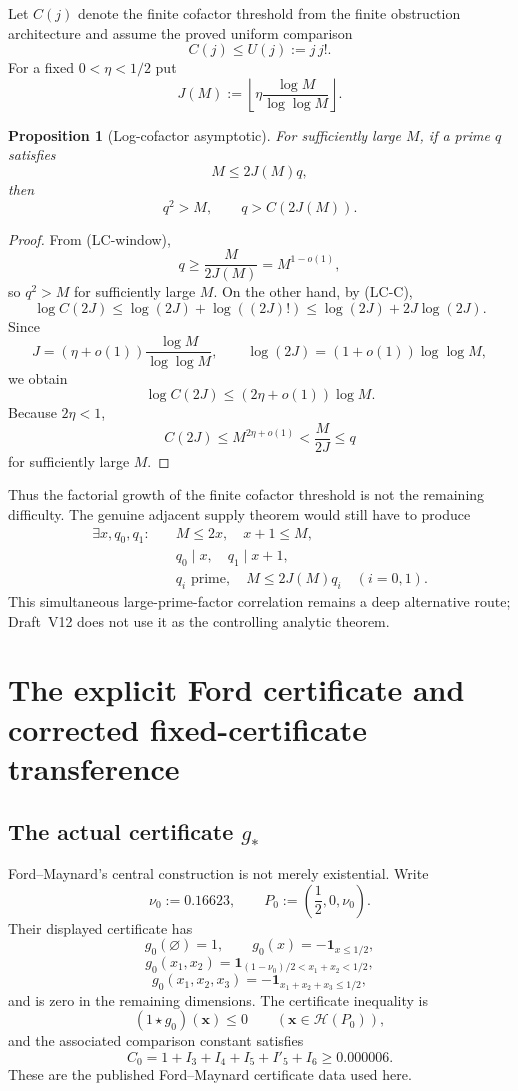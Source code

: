 \documentclass[11pt]{article}
\newtheorem{proposition}[theorem]{Proposition}
\theoremstyle{definition}
\theoremstyle{remark}
\newcommand{\1}{\mathbf 1}
\begin{document}
Let $C(j)$ denote the finite cofactor threshold from the finite obstruction architecture and assume the proved
uniform comparison
\[
 C(j)\le U(j):=j\,j!.
 \tag{LC-C}
\]
For a fixed $0<\eta<1/2$ put
\[
 J(M):=\left\lfloor \eta\frac{\log M}{\log\log M}\right\rfloor.
 \tag{LC-J}
\]

\begin{proposition}[Log-cofactor asymptotic]\label{prop:logcof}
For sufficiently large $M$, if a prime $q$ satisfies
\[
 M\le 2J(M)q,
 \tag{LC-window}
\]
then
\[
 q^2>M,\qquad q>C(2J(M)).
\]
\end{proposition}
\begin{proof}
From (LC-window),
\[
 q\ge \frac{M}{2J(M)}=M^{1-o(1)},
\]
so $q^2>M$ for sufficiently large $M$.  On the other hand, by (LC-C),
\[
 \log C(2J)\le \log(2J)+\log((2J)!)
 \le \log(2J)+2J\log(2J).
\]
Since
\[
 J=(\eta+o(1))\frac{\log M}{\log\log M},\qquad
 \log(2J)=(1+o(1))\log\log M,
\]
we obtain
\[
 \log C(2J)\le (2\eta+o(1))\log M.
\]
Because $2\eta<1$,
\[
 C(2J)\le M^{2\eta+o(1)}<\frac{M}{2J}\le q
\]
for sufficiently large $M$.
\end{proof}

Thus the factorial growth of the finite cofactor threshold is not the remaining difficulty.  The genuine
adjacent supply theorem would still have to produce
\[
 \boxed{\begin{aligned}
 \exists x,q_0,q_1:\quad &M\le2x,\quad x+1\le M,\\
 &q_0\mid x,\quad q_1\mid x+1,\\
 &q_i\text{ prime},\quad M\le2J(M)q_i\quad(i=0,1).
 \end{aligned}}
 \tag{LC-supply}
\]
This simultaneous large-prime-factor correlation remains a deep alternative route; Draft~V12 does not use it as
the controlling analytic theorem.

\section{The explicit Ford certificate and corrected fixed-certificate transference}
\label{sec:fixed-cert}

\subsection{The actual certificate $g_*$}

Ford--Maynard's central construction is not merely existential.  Write
\[
 \nu_0:=0.16623,\qquad P_0:=\left(\frac12,0,\nu_0\right).
\]
Their displayed certificate has
\[
 g_0(\varnothing)=1,\qquad
 g_0(x)=-\mathbf 1_{x\le1/2},
\]
\[
 g_0(x_1,x_2)
 =\mathbf 1_{(1-\nu_0)/2<x_1+x_2<1/2},
\]
\[
 g_0(x_1,x_2,x_3)
 =-\mathbf 1_{x_1+x_2+x_3\le1/2},
\]
and is zero in the remaining dimensions.  The certificate inequality is
\[
 (1\star g_0)(\mathbf x)\le0\qquad(\mathbf x\in\mathcal H(P_0)),
\]
and the associated comparison constant satisfies
\[
 C_0=1+I_3+I_4+I_5+I'_5+I_6\ge 0.000006.
 \tag{FC-1}
\]
These are the published Ford--Maynard certificate data used here.
\end{document}
